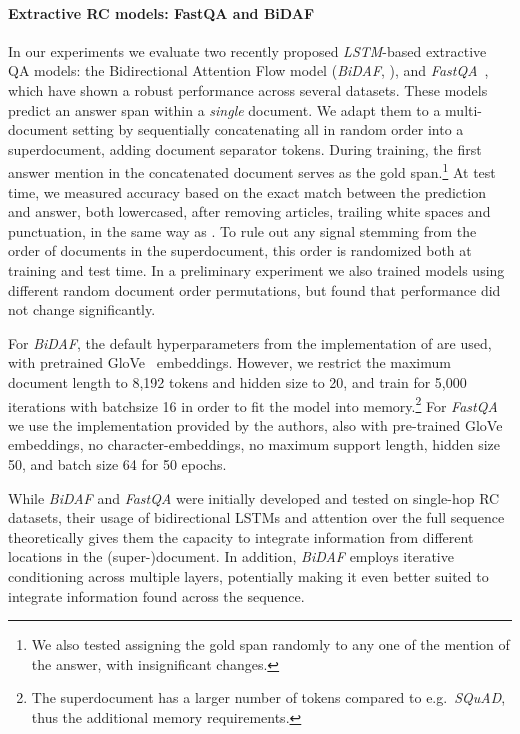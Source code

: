 \documentclass[11pt,letterpaper]{article}
\begin{document}
\paragraph{Extractive RC models: FastQA and BiDAF}
In our experiments we evaluate two recently proposed \emph{LSTM}-based extractive QA models: the Bidirectional Attention Flow model (\emph{BiDAF}, ), and \emph{FastQA}~\cite{Weissenborn2017fastQA}, which have shown a robust performance across several datasets.
These models predict an answer span within a \emph{single} document.
We adapt them to a multi-document setting by sequentially concatenating all  in random order into a superdocument, adding document separator tokens.
During training, the first answer mention in the concatenated document serves as the gold span.\footnote{
    We also tested assigning the gold span randomly to any one of the mention of the answer, with insignificant changes.
}
At test time, we measured accuracy based on the exact match between the prediction and answer, both lowercased, after removing articles, trailing white spaces and punctuation, in the same way as .
To rule out any signal stemming from the order of documents in the superdocument, this order is randomized both at training and test time.
In a preliminary experiment we also trained models using different random document order permutations, but found that performance did not change significantly.




For \emph{BiDAF}, the default hyperparameters from the implementation of  are used, with pretrained GloVe~\cite{pennington_2014_glove} embeddings.
However, we restrict the maximum document length to 8,192 tokens and hidden size to 20, and train for 5,000 iterations with batchsize 16 in order to fit the model into memory.\footnote{
    The superdocument has a larger number of tokens compared to e.g.~\emph{SQuAD}, thus the additional memory requirements.
}
For \emph{FastQA} we use the implementation provided by the authors, also with pre-trained GloVe embeddings, no character-embeddings, no maximum support length, hidden size 50, and batch size 64 for 50 epochs.

While \emph{BiDAF} and \emph{FastQA} were initially developed and tested on single-hop RC datasets, their usage of bidirectional LSTMs and attention over the full sequence theoretically gives them the capacity to integrate information from different locations in the (super-)document.
In addition, \emph{BiDAF} employs iterative conditioning across multiple layers, potentially making it even better suited to integrate information found across the sequence.
\end{document}

